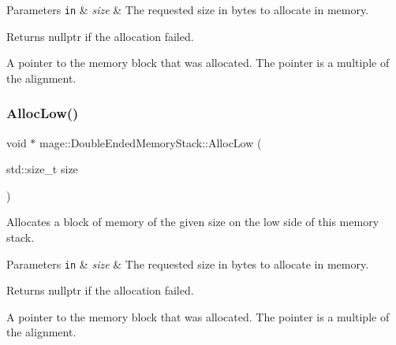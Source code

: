 \begin{DoxyParams}[1]{Parameters}
\mbox{\tt in}  & {\em size} & The requested size in bytes to allocate in memory. \\
\hline
\end{DoxyParams}
\begin{DoxyReturn}{Returns}
{\ttfamily nullptr} if the allocation failed. 

A pointer to the memory block that was allocated. The pointer is a multiple of the alignment. 
\end{DoxyReturn}
\mbox{\label{classmage_1_1_double_ended_memory_stack_a14bf2c14a15d08e1d6e25b13962811f0}} 
\subsubsection{\texorpdfstring{Alloc\+Low()}{AllocLow()}}
{\footnotesize\ttfamily void $\ast$ mage\+::\+Double\+Ended\+Memory\+Stack\+::\+Alloc\+Low (\begin{DoxyParamCaption}\item[{std\+::size\+\_\+t}]{size }\end{DoxyParamCaption})\hspace{0.3cm}{\ttfamily [noexcept]}}

Allocates a block of memory of the given size on the low side of this memory stack.


\begin{DoxyParams}[1]{Parameters}
\mbox{\tt in}  & {\em size} & The requested size in bytes to allocate in memory. \\
\hline
\end{DoxyParams}
\begin{DoxyReturn}{Returns}
{\ttfamily nullptr} if the allocation failed. 

A pointer to the memory block that was allocated. The pointer is a multiple of the alignment. 
\end{DoxyReturn}
\mbox{\label{classmage_1_1_double_ended_memory_stack_a84d8573c9f565223af48307836b91a95}} 
